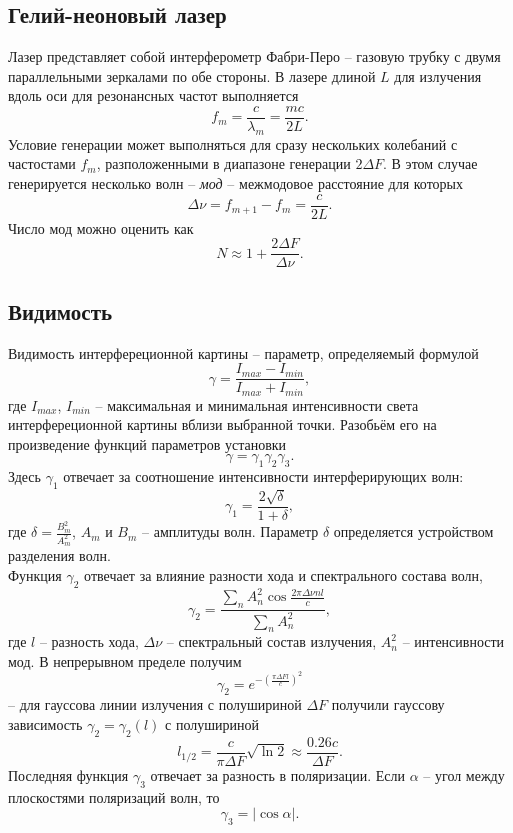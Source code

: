 \documentclass[a4paper, 12pt]{article}
\begin{document}
\subsection*{Гелий-неоновый лазер}
Лазер представляет собой интерферометр Фабри-Перо -- газовую трубку с двумя параллельными зеркалами по обе стороны. В лазере длиной $L$ для излучения вдоль оси для резонансных частот выполняется
\begin{equation}
f_m = \dfrac{c}{\lambda_m} = \dfrac{mc}{2L}.
\end{equation}
Условие генерации может выполняться для сразу нескольких колебаний с частостами $f_m$, разположенными в диапазоне генерации $2\Delta F$. В этом случае генерируется несколько волн -- \textit{мод} -- межмодовое расстояние для которых
\begin{equation}
\Delta \nu = f_{m+1} - f_m = \dfrac{c}{2L}.
\end{equation}
Число мод можно оценить как 
\begin{equation}
N \approx 1 + \dfrac{2\Delta F}{\Delta \nu}.
\end{equation}
\subsection*{Видимость}
Видимость интерфереционной картины -- параметр, определяемый формулой
\begin{equation}
\gamma = \dfrac{I_{max} - I_{min}}{I_{max} + I_{min}},
\end{equation}
где $I_{max}$, $I_{min}$ -- максимальная и минимальная интенсивности света интерфереционной картины вблизи выбранной точки. Разобьём его на произведение функций параметров установки
$$
\gamma = \gamma_1 \gamma_2 \gamma_3.
$$
Здесь $\gamma_1$ отвечает за соотношение интенсивности интерферирующих волн:
\begin{equation}
\gamma_1 = \dfrac{2\sqrt{\delta}}{1+\delta},
\end{equation}
где $\delta = \frac{B_m^2}{A_m^2}$, $A_m$ и $B_m$ -- амплитуды волн. Параметр $\delta$ определяется устройством разделения волн.\\
Функция $\gamma_2$ отвечает за влияние разности хода и спектрального состава волн,
$$
\gamma_2 = \dfrac{\sum\limits_n A^2_n \cos \frac{2\pi \Delta \nu n l}{c}}{\sum\limits_n A_n^2},
$$
где $l$ -- разность хода, $\Delta \nu$ -- спектральный состав излучения, $A_n^2$ -- интенсивности мод. В непрерывном пределе получим
$$
\gamma_2 = e^{-\left(\frac{\pi \Delta F l}{c}\right)^2}
$$
-- для гауссова линии излучения с полушириной $\Delta F$ получили гауссову зависимость $\gamma_2 = \gamma_2(l)$ с полушириной 
\begin{equation}
l_{1/2} = \dfrac{c}{\pi \Delta F}\sqrt{\ln 2} \approx \dfrac{0.26 c}{\Delta F}.
\end{equation}
Последняя функция $\gamma_3$ отвечает за разность в поляризации. Если $\alpha$ -- угол между плоскостями поляризаций волн, то
\begin{equation}
\gamma_3 = |\cos \alpha|.
\end{equation}
\end{document}
